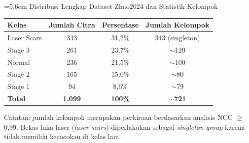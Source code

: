 \label{lamp:dataset}

\noindent\hangindent=5.6em
%
Distribusi Lengkap Dataset Zhao2024 dan Statistik Kelompok

\vspace{4pt}

\noindent
\begin{tabular}{l c c c}
  \toprule
  \textbf{Kelas} & \textbf{Jumlah Citra} & \textbf{Persentase} & \textbf{Jumlah Kelompok} \\
  \midrule
  Laser Scars & 343 & 31,2\%  & 343 (singleton) \\
  Stage 3     & 261 & 23,7\%  & $\sim$120 \\
  Normal      & 236 & 21,5\%  & $\sim$100 \\
  Stage 2     & 165 & 15,0\%  & $\sim$80 \\
  Stage 1     & 94  &  8,6\%  & $\sim$79 \\
  \midrule
  \textbf{Total} & \textbf{1.099} & \textbf{100\%} & \textbf{$\sim$721} \\
  \bottomrule
\end{tabular}

\vspace{6pt}
\noindent Catatan: jumlah kelompok merupakan perkiraan berdasarkan analisis NCC $\geq$ 0,99.
Bekas luka laser (\textit{laser scars}) diperlakukan sebagai \textit{singleton group} karena
tidak memiliki kecocokan di kelas lain.
